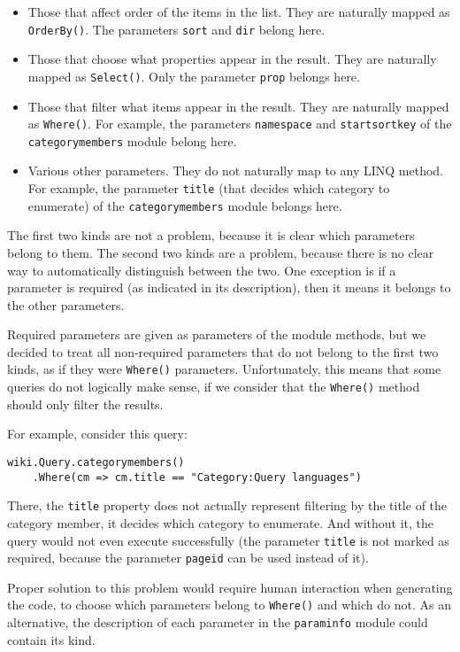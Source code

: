 \begin{itemize}
\item Those that affect order of the items in the list. They are naturally mapped as \lstinline{OrderBy()}.
The parameters \texttt{sort} and \texttt{dir} belong here.
\item Those that choose what properties appear in the result. They are naturally mapped as \lstinline{Select()}.
Only the parameter \texttt{prop} belongs here.
\item Those that filter what items appear in the result. They are naturally mapped as \lstinline{Where()}.
For example, the parameters \texttt{namespace} and \texttt{startsortkey}
of the \texttt{categorymembers} module belong here.
\item Various other parameters. They do not naturally map to any LINQ method.
For example, the parameter \texttt{title} (that decides which category to enumerate)
of the \texttt{categorymembers} module belongs here.
\end{itemize}

The first two kinds are not a problem, because it is clear which parameters belong to them.
The second two kinds are a problem, because there is no clear way to automatically distinguish between the two.
One exception is if a parameter is required (as indicated in its description),
then it means it belongs to the other parameters.

Required parameters are given as parameters of the module methods,
but we decided to treat all non-required parameters that do not belong to the first two kinds,
as if they were \lstinline{Where()} parameters.
Unfortunately, this means that some queries do not logically make sense,
if we consider that the \lstinline{Where()} method should only filter the results.

For example, consider this query:

\begin{lstlisting}
wiki.Query.categorymembers()
    .Where(cm => cm.title == "Category:Query languages")
\end{lstlisting}

There, the \lstinline{title} property does not actually represent filtering
by the title of the category member, it decides which category to enumerate.
And without it, the query would not even execute successfully
(the parameter \texttt{title} is not marked as required, because the parameter \texttt{pageid} can be used instead of it).

Proper solution to this problem would require human interaction when generating the code,
to choose which parameters belong to \lstinline{Where()} and which do not.
As an alternative, the description of each parameter in the \texttt{paraminfo} module could contain its kind.